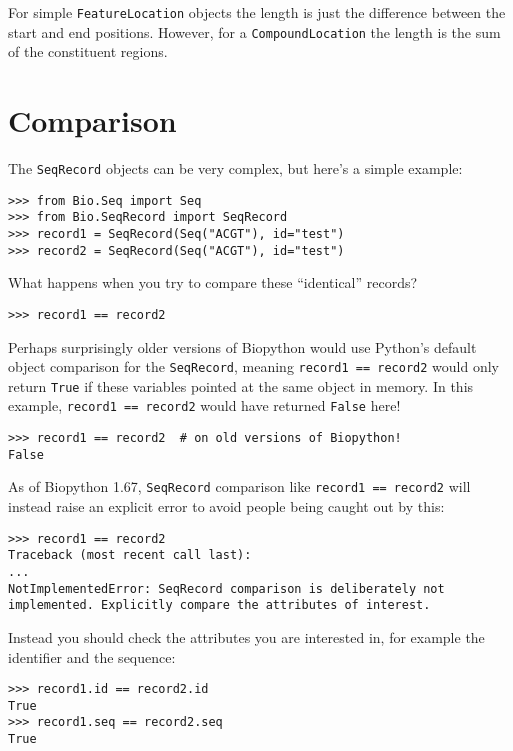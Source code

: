 For simple \verb|FeatureLocation| objects the length is just
the difference between the start and end positions. However,
for a \verb|CompoundLocation| the length is the sum of the
constituent regions.

\section{Comparison}

The \verb|SeqRecord| objects can be very complex, but here's a simple example:

\begin{verbatim}
>>> from Bio.Seq import Seq
>>> from Bio.SeqRecord import SeqRecord
>>> record1 = SeqRecord(Seq("ACGT"), id="test")
>>> record2 = SeqRecord(Seq("ACGT"), id="test")
\end{verbatim}

What happens when you try to compare these ``identical'' records?

\begin{verbatim}
>>> record1 == record2
\end{verbatim}

Perhaps surprisingly older versions of Biopython would use Python's default object
comparison for the \verb|SeqRecord|, meaning \verb|record1 == record2| would
only return \verb|True| if these variables pointed at the same object in memory.
In this example, \verb|record1 == record2| would have returned \verb|False|
here!

\begin{verbatim}
>>> record1 == record2  # on old versions of Biopython!
False
\end{verbatim}

As of Biopython 1.67, \verb|SeqRecord| comparison like \verb|record1 == record2|
will instead raise an explicit error to avoid people being caught out by this:

\begin{verbatim}
>>> record1 == record2
Traceback (most recent call last):
...
NotImplementedError: SeqRecord comparison is deliberately not implemented. Explicitly compare the attributes of interest.
\end{verbatim}

Instead you should check the attributes you are interested in, for example the
identifier and the sequence:

\begin{verbatim}
>>> record1.id == record2.id
True
>>> record1.seq == record2.seq
True
\end{verbatim}

